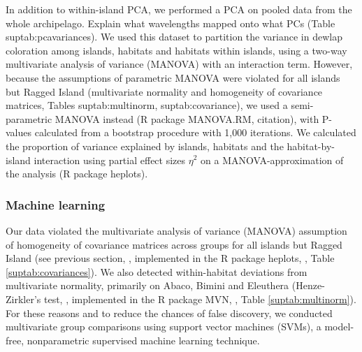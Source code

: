 In addition to within-island PCA, we performed a PCA on pooled data from the whole archipelago. Explain what wavelengths mapped onto what PCs (Table suptab:pcavariances). We used this dataset to partition the variance in dewlap coloration among islands, habitats and habitats within islands, using a two-way multivariate analysis of variance (MANOVA) with an interaction term. However, because the assumptions of parametric MANOVA were violated for all islands but Ragged Island (multivariate normality and homogeneity of covariance matrices, Tables suptab:multinorm, suptab:covariance), we used a semi-parametric MANOVA instead (R package MANOVA.RM, citation), with P-values calculated from a bootstrap procedure with 1,000 iterations. We calculated the proportion of variance explained by islands, habitats and the habitat-by-island interaction using partial effect sizes $\eta^2$ on a MANOVA-approximation of the analysis (R package heplots).

\subsubsection*{Machine learning}


Our data violated the multivariate analysis of variance (MANOVA) assumption of homogeneity of covariance matrices across groups for all islands but Ragged Island (see previous section, \citealt{Box1949, Morrison1988}, implemented in the R package heplots, \citealt{Fox2018},  Table \ref{suptab:covariances}). We also detected within-habitat deviations from multivariate normality, primarily on Abaco, Bimini and Eleuthera (Henze-Zirkler's test, \citealt{Henze1990}, implemented in the R package MVN, \citealt{Korkmaz2014}, Table \ref{suptab:multinorm}). For these reasons and to reduce the chances of false discovery, we conducted multivariate group comparisons using support vector machines (SVMs), a model-free, nonparametric supervised machine learning technique.\\


